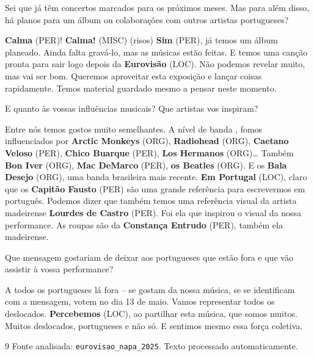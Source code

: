 \documentclass[12pt,a4paper]{article}
\begin{document}
Sei que já têm concertos marcados para os próximos meses. Mas para além disso, há planos para um álbum ou colaborações com outros artistas portugueses?



\textbf{Calma} (PER)! \textbf{Calma!} (MISC) (risos) \textbf{Sim} (PER), já temos um álbum planeado. Ainda falta gravá-lo, mas as músicas estão feitas. E temos uma canção pronta para sair logo depois da \textbf{Eurovisão} (LOC). Não podemos revelar muito, mas vai ser bom. Queremos aproveitar esta exposição e lançar coisas rapidamente. Temos material guardado mesmo a pensar neste momento.



E quanto às vossas influências musicais? Que artistas vos inspiram?



Entre nós temos gostos muito semelhantes. A nível de banda , fomos influenciados por \textbf{Arctic Monkeys} (ORG), \textbf{Radiohead} (ORG), \textbf{Caetano Veloso} (PER), \textbf{Chico Buarque} (PER), \textbf{Los Hermanos} (ORG)… Também \textbf{Bon Iver} (ORG), \textbf{Mac DeMarco} (PER), \textbf{os Beatles} (ORG). E os \textbf{Bala Desejo} (ORG), uma banda brasileira mais recente. \textbf{Em Portugal} (LOC), claro que os \textbf{Capitão Fausto} (PER) são uma grande referência para escrevermos em português. Podemos dizer que também temos uma referência visual da artista madeirense \textbf{Lourdes de Castro} (PER). Foi ela que inspirou o visual da nossa performance. As roupas são da \textbf{Constança Entrudo} (PER), também ela madeirense.



Que mensagem gostariam de deixar aos portugueses que estão fora e que vão assistir à vossa performance?



A todos os portugueses lá fora -- se gostam da nossa música, se se identificam com a mensagem, votem no dia 13 de maio. Vamos representar todos os deslocados. \textbf{Percebemos} (LOC), ao partilhar esta música, que somos muitos. Muitos deslocados, portugueses e não só. E sentimos mesmo essa força coletiva.

\vspace{1cm}
\begin{thebibliography}{9}
    Fonte analisada: \texttt{eurovisao\_napa\_2025}. Texto processado automaticamente.
\end{thebibliography}
\end{document}
